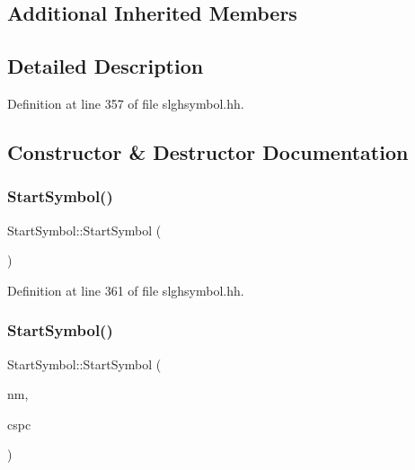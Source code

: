 \subsection*{Additional Inherited Members}


\subsection{Detailed Description}


Definition at line 357 of file slghsymbol.\+hh.



\subsection{Constructor \& Destructor Documentation}
\mbox{\label{class_start_symbol_a038b771f197b5218dedf7aa2ee41aa9f}} 
\subsubsection{\texorpdfstring{StartSymbol()}{StartSymbol()}\hspace{0.1cm}{\footnotesize\ttfamily [1/2]}}
{\footnotesize\ttfamily Start\+Symbol\+::\+Start\+Symbol (\begin{DoxyParamCaption}\item[{void}]{ }\end{DoxyParamCaption})\hspace{0.3cm}{\ttfamily [inline]}}



Definition at line 361 of file slghsymbol.\+hh.

\mbox{\label{class_start_symbol_a2b7b7d19a42d3d5d0c271c81f4a35d31}} 
\subsubsection{\texorpdfstring{StartSymbol()}{StartSymbol()}\hspace{0.1cm}{\footnotesize\ttfamily [2/2]}}
{\footnotesize\ttfamily Start\+Symbol\+::\+Start\+Symbol (\begin{DoxyParamCaption}\item[{const string \&}]{nm,  }\item[{\mbox{\hyperlink{class_addr_space}{Addr\+Space}} $\ast$}]{cspc }\end{DoxyParamCaption})}



